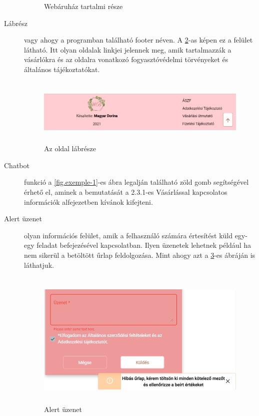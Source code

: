 \begin{description}
\begin{figure}[H]
		\hspace{5pt}
		\caption{Webáruház tartalmi része}
		\label{fig.example-2}
	\end{figure}
	
	\item[Lábrész] vagy ahogy a programban található footer néven. A \ref{fig.exemple-3}-as képen ez a felület látható. Itt olyan oldalak linkjei jelennek meg, amik tartalmazzák a vásárlókra és az oldalra vonatkozó fogyasztóvédelmi törvényeket és általános tájékoztatókat.
	 \begin{figure}[H]
	 	\centering
	 	\includegraphics[width=1.0\textwidth,height=120px]{images/footer.png}
	 	\caption{Az oldal lábrésze}
	 	\label{fig.exemple-3}
	 \end{figure}
	\item[Chatbot] funkció a \ref{fig.exemple-1}-es ábra legalján található zöld gomb segítségével érhető el, aminek a bemutatását a 2.3.1-es Vásárlással kapcsolatos információk alfejezetben kívánok kifejteni.
	\item[Alert üzenet] olyan információs felület, amik a felhasználó számára értesítést küld egy-egy feladat befejezésével kapcsolatban. Ilyen üzenetek lehetnek például ha nem sikerül a betöltött űrlap feldolgozása. Mint ahogy azt a \ref{fig.exemple-4}-es ábráján is láthatjuk.
	\begin{figure}[H]
		\centering
		\includegraphics[width=1.0\textwidth,height=250px]{images/alert_message.png}
		\caption{Alert üzenet}
		\label{fig.exemple-4}
	\end{figure}
\end{description}


